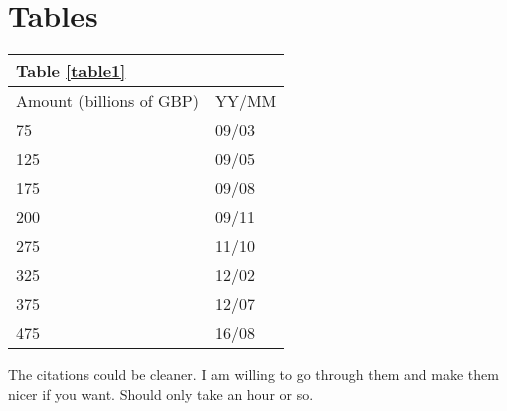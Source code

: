 \documentclass[notitlepage,12pt]{report}
\begin{document}
\chapter{Tables}\label{tables}

\label{table1}
\begin{tabular}{|l|l|}
\hline
Table \ref{table1} & \\ \hline
Amount (billions of GBP) & YY/MM \\ \hline
75 & 09/03 \\
125 & 09/05 \\
175 & 09/08 \\
200 & 09/11 \\
275 & 11/10 \\
325 & 12/02 \\
375 & 12/07 \\
475 & 16/08 \\
\hline
\end{tabular}

\printbibliography
{\footnotesize The citations could be cleaner. I am willing to go through them and make them nicer if you want. Should only take an hour or so.}
\end{document}
